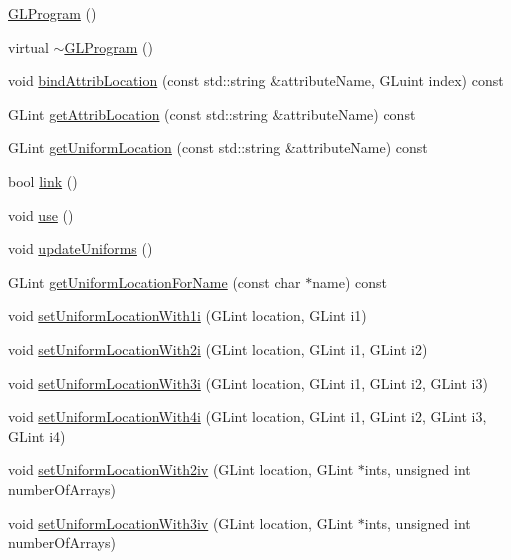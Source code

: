 \begin{DoxyCompactItemize}
\item 
\hyperlink{classGLProgram_ac6a2778c8bf8c49e0d8ceb6d88e1a8fe}{G\+L\+Program} ()
\item 
virtual \hyperlink{classGLProgram_afa830f5d1f5a59e92ec8464387c04bba}{$\sim$\+G\+L\+Program} ()
\item 
void \hyperlink{classGLProgram_a06fab65fe4aa591530f2b5e61516756c}{bind\+Attrib\+Location} (const std\+::string \&attribute\+Name, G\+Luint index) const
\item 
G\+Lint \hyperlink{classGLProgram_a2bdaba0068ae955ee8395f6017f7781b}{get\+Attrib\+Location} (const std\+::string \&attribute\+Name) const
\item 
G\+Lint \hyperlink{classGLProgram_a36c4bb72ceff2951794c8b0b52ed9ef1}{get\+Uniform\+Location} (const std\+::string \&attribute\+Name) const
\item 
bool \hyperlink{classGLProgram_a667d81ca9b3ac97fb8959aacdcb96f0b}{link} ()
\item 
void \hyperlink{classGLProgram_a02d4c488d50f8e4235e6476d111b0890}{use} ()
\item 
void \hyperlink{classGLProgram_a4c3fb8cdcfbdcd1e88c9b1b768ad64e9}{update\+Uniforms} ()
\item 
G\+Lint \hyperlink{classGLProgram_a096688ee4d0f1628f228325e1c64176c}{get\+Uniform\+Location\+For\+Name} (const char $\ast$name) const
\item 
void \hyperlink{classGLProgram_afa360f891bfeb78a7c243b79ae549325}{set\+Uniform\+Location\+With1i} (G\+Lint location, G\+Lint i1)
\item 
void \hyperlink{classGLProgram_abefc77093c5e21dfdf7e0c71bed024c6}{set\+Uniform\+Location\+With2i} (G\+Lint location, G\+Lint i1, G\+Lint i2)
\item 
void \hyperlink{classGLProgram_a7488acc88c3b6376c714d6b9cd242f31}{set\+Uniform\+Location\+With3i} (G\+Lint location, G\+Lint i1, G\+Lint i2, G\+Lint i3)
\item 
void \hyperlink{classGLProgram_ab0763aef27f2734758ea139dbfe9e139}{set\+Uniform\+Location\+With4i} (G\+Lint location, G\+Lint i1, G\+Lint i2, G\+Lint i3, G\+Lint i4)
\item 
void \hyperlink{classGLProgram_ae367303d8a685968a2c94ddc26ca2136}{set\+Uniform\+Location\+With2iv} (G\+Lint location, G\+Lint $\ast$ints, unsigned int number\+Of\+Arrays)
\item 
void \hyperlink{classGLProgram_a2fb342d0da47da38ec70fd670af18fe4}{set\+Uniform\+Location\+With3iv} (G\+Lint location, G\+Lint $\ast$ints, unsigned int number\+Of\+Arrays)

\end{DoxyCompactItemize}
